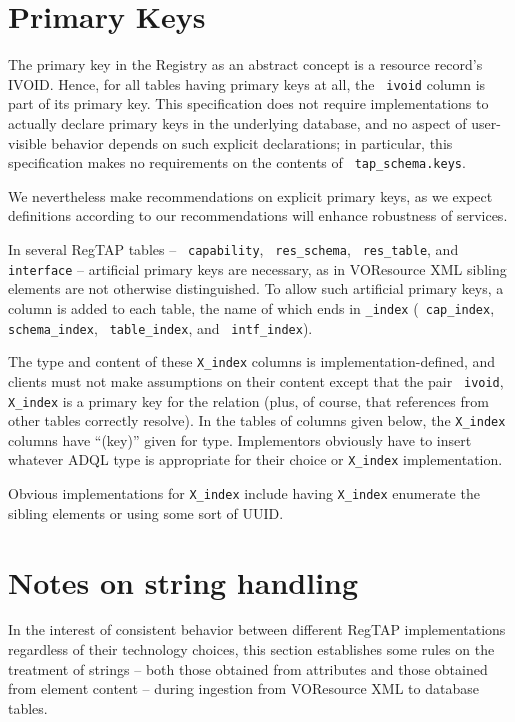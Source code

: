 \documentclass[11pt,a4paper]{ivoa}
\newcommand{\rtent}[1]{\texttt{\color{rtcolor} #1}}
\newcommand{\tapent}[1]{\texttt{\color{tapcolor} #1}}
\begin{document}
\section{Primary Keys}

\label{primarykeys}

The primary key in the Registry as an abstract concept is a resource
record's IVOID.  Hence, for all tables having primary keys at all, the
\rtent{ivoid} column is part of its primary key.  This
specification does not require implementations to actually declare
primary keys in the underlying database, and no aspect of user-visible
behavior depends on such explicit declarations; in particular, this
specification makes no requirements on the contents of
\tapent{tap\_schema.keys}.

We nevertheless make recommendations on explicit primary keys, as
we expect definitions according to our recommendations will enhance
robustness of services.

In several RegTAP tables -- \rtent{capability},
\rtent{res\_schema}, \rtent{res\_table}, and
\rtent{interface} -- artificial primary keys are necessary, as
in VOResource XML sibling elements are not otherwise distinguished.  To
allow such artificial primary keys, a column is added to each table, the
name of which ends in \texttt{\_index} (\rtent{cap\_index},
\rtent{schema\_index}, \rtent{table\_index}, and
\rtent{intf\_index}).

The type and content of these \texttt{X\_index} columns is
implementation-defined, and clients must not make assumptions on their
content except that the pair \rtent{ivoid}, \texttt{X\_index} is a primary
key for the relation (plus, of course, that references from other tables
correctly resolve).  In the tables of columns given below, the
\texttt{X\_index} columns have ``(key)'' given for type.  Implementors
obviously have to insert whatever ADQL type is appropriate for their
choice or \texttt{X\_index} implementation.

Obvious implementations for \texttt{X\_index} include having
\texttt{X\_index} enumerate the sibling elements or using some sort
of UUID.


\section{Notes on string handling}

\label{stringnorm}

In the interest of consistent behavior between different RegTAP
implementations regardless of their technology choices, this section
establishes some rules on the treatment of strings -- both those
obtained from attributes and those obtained from element
content -- during ingestion from VOResource XML to database
tables.
\end{document}
